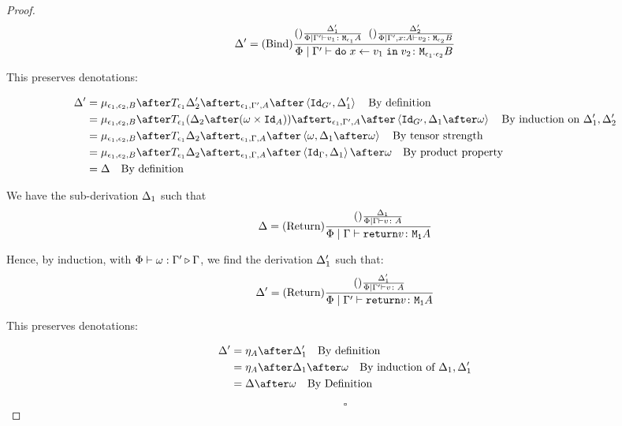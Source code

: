 \documentclass{Report}
\begin{document}
\begin{proof}
\begin{equation}
    \Delta' = (\text{Bind}) \frac{
        (\text{}) \frac{\Delta_1'}{\Phi\mid\Gamma' \vdash v_1 \colon \texttt{M}_{\epsilon_1}{A}}
        \;\;
        (\text{}) \frac{\Delta_2'}{\Phi\mid\Gamma',x: A \vdash v_2 \colon \texttt{M}_{\epsilon_2}{B}}
    }{
        \Phi\mid\Gamma' \vdash \texttt{do}\; x \leftarrow v_1 \;\texttt{in}\; v_2 \colon \texttt{M}_{\epsilon_1\cdot\epsilon_2}{B}
    }
\end{equation}

This preserves denotations:

\begin{align}
    \D' & = \bind{\e_1}{\e_2}{B}\after\T{\e_1}{\D_2'}\after\tstrength{\e_1}{\G'}{A}\after\pr{\Id{G'}}{\D_1'}\qt{By definition}\\
    & = \bind{\e_1}{\e_2}{B}\after\T{\e_1}{(\D_2\after(\w\times\Id{A}))}\after\tstrength{\e_1}{\G'}{A}\after\pr{\Id{G'}}{\D_1\after\w}\qt{By induction on $\D_1', \D_2'$}\\
    & = \bind{\e_1}{\e_2}{B}\after\T{\e_1}{\D_2}\after\tstrength{\e_1}{\G}{A}\after\pr{\w}{\D_1\after\w}\qt{By tensor strength}\\
    & = \bind{\e_1}{\e_2}{B}\after\T{\e_1}{\D_2}\after\tstrength{\e_1}{\G}{A}\after\pr{\idg}{\D_1}\after\w\qt{By product property}\\
    & = \D \qt{By definition}
\end{align}

    We have the sub-derivation $\Delta_1$ such that
    \begin{equation}
        \Delta = (\text{Return}) \frac{(\text{}) \frac{\Delta_1}{\Phi\mid\Gamma \vdash v \colon A}}{\Phi\mid\Gamma \vdash \texttt{return} v \colon \texttt{M}_{\texttt{1}}{A}}
    \end{equation}

    Hence, by induction, with $\Phi\vdash \omega : \Gamma' \triangleright \Gamma$, we find the derivation $\Delta_1'$ such that:
    \begin{equation}
        \Delta' = (\text{Return}) \frac{(\text{}) \frac{\Delta_1'}{\Phi\mid\Gamma' \vdash v \colon A}}{\Phi\mid\Gamma' \vdash \texttt{return} v \colon \texttt{M}_{\texttt{1}}{A}}
    \end{equation}

    This preserves denotations:

    \begin{align}
        \D' & = \point{A}\after\D_1' \qt{By definition}\\
            & = \point{A}\after\D_1\after\w\qt{By induction of $\D_1, \D_1'$}\\
            & = \D\after\w\qt{By Definition}
    \end{align}

    $$\square$$
\end{proof}
\end{document}
